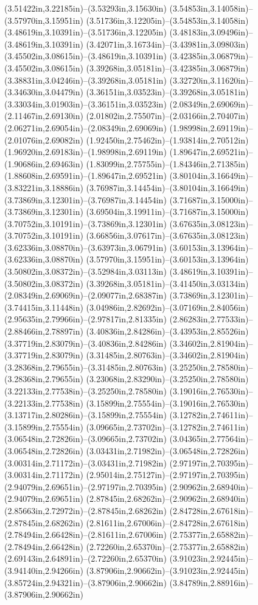 (3.51422in,3.22185in)--(3.53293in,3.15630in) (3.54853in,3.14058in)--(3.57970in,3.15951in) (3.51736in,3.12205in)--(3.54853in,3.14058in) (3.48619in,3.10391in)--(3.51736in,3.12205in) (3.48183in,3.09496in)--(3.48619in,3.10391in) (3.42071in,3.16734in)--(3.43981in,3.09803in) (3.45502in,3.08615in)--(3.48619in,3.10391in) (3.42385in,3.06879in)--(3.45502in,3.08615in) (3.39268in,3.05181in)--(3.42385in,3.06879in) (3.38831in,3.04246in)--(3.39268in,3.05181in) (3.32720in,3.11620in)--(3.34630in,3.04479in) (3.36151in,3.03523in)--(3.39268in,3.05181in) (3.33034in,3.01903in)--(3.36151in,3.03523in) (2.08349in,2.69069in)--(2.11467in,2.69130in) (2.01802in,2.75507in)--(2.03166in,2.70407in) (2.06271in,2.69054in)--(2.08349in,2.69069in) (1.98998in,2.69119in)--(2.01076in,2.69082in) (1.92450in,2.75462in)--(1.93814in,2.70512in) (1.96920in,2.69183in)--(1.98998in,2.69119in) (1.89647in,2.69521in)--(1.90686in,2.69463in) (1.83099in,2.75755in)--(1.84346in,2.71385in) (1.88608in,2.69591in)--(1.89647in,2.69521in) (3.80104in,3.16649in)--(3.83221in,3.18886in) (3.76987in,3.14454in)--(3.80104in,3.16649in) (3.73869in,3.12301in)--(3.76987in,3.14454in) (3.71687in,3.15000in)--(3.73869in,3.12301in) (3.69504in,3.19911in)--(3.71687in,3.15000in) (3.70752in,3.10191in)--(3.73869in,3.12301in) (3.67635in,3.08123in)--(3.70752in,3.10191in) (3.66856in,3.07617in)--(3.67635in,3.08123in) (3.62336in,3.08870in)--(3.63973in,3.06791in) (3.60153in,3.13964in)--(3.62336in,3.08870in) (3.57970in,3.15951in)--(3.60153in,3.13964in) (3.50802in,3.08372in)--(3.52984in,3.03113in) (3.48619in,3.10391in)--(3.50802in,3.08372in) (3.39268in,3.05181in)--(3.41450in,3.03134in) (2.08349in,2.69069in)--(2.09077in,2.68387in) (3.73869in,3.12301in)--(3.74415in,3.11448in) (3.04986in,2.82692in)--(3.07169in,2.84056in) (2.95635in,2.79966in)--(2.97817in,2.81335in) (2.86283in,2.77533in)--(2.88466in,2.78897in) (3.40836in,2.84286in)--(3.43953in,2.85526in) (3.37719in,2.83079in)--(3.40836in,2.84286in) (3.34602in,2.81904in)--(3.37719in,2.83079in) (3.31485in,2.80763in)--(3.34602in,2.81904in) (3.28368in,2.79655in)--(3.31485in,2.80763in) (3.25250in,2.78580in)--(3.28368in,2.79655in) (3.23068in,2.83290in)--(3.25250in,2.78580in) (3.22133in,2.77538in)--(3.25250in,2.78580in) (3.19016in,2.76530in)--(3.22133in,2.77538in) (3.15899in,2.75554in)--(3.19016in,2.76530in) (3.13717in,2.80286in)--(3.15899in,2.75554in) (3.12782in,2.74611in)--(3.15899in,2.75554in) (3.09665in,2.73702in)--(3.12782in,2.74611in) (3.06548in,2.72826in)--(3.09665in,2.73702in) (3.04365in,2.77564in)--(3.06548in,2.72826in) (3.03431in,2.71982in)--(3.06548in,2.72826in) (3.00314in,2.71172in)--(3.03431in,2.71982in) (2.97197in,2.70395in)--(3.00314in,2.71172in) (2.95014in,2.75127in)--(2.97197in,2.70395in) (2.94079in,2.69651in)--(2.97197in,2.70395in) (2.90962in,2.68940in)--(2.94079in,2.69651in) (2.87845in,2.68262in)--(2.90962in,2.68940in) (2.85663in,2.72972in)--(2.87845in,2.68262in) (2.84728in,2.67618in)--(2.87845in,2.68262in) (2.81611in,2.67006in)--(2.84728in,2.67618in) (2.78494in,2.66428in)--(2.81611in,2.67006in) (2.75377in,2.65882in)--(2.78494in,2.66428in) (2.72260in,2.65370in)--(2.75377in,2.65882in) (2.69143in,2.64891in)--(2.72260in,2.65370in) (3.91023in,2.92445in)--(3.94140in,2.94266in) (3.87906in,2.90662in)--(3.91023in,2.92445in) (3.85724in,2.94321in)--(3.87906in,2.90662in) (3.84789in,2.88916in)--(3.87906in,2.90662in) 